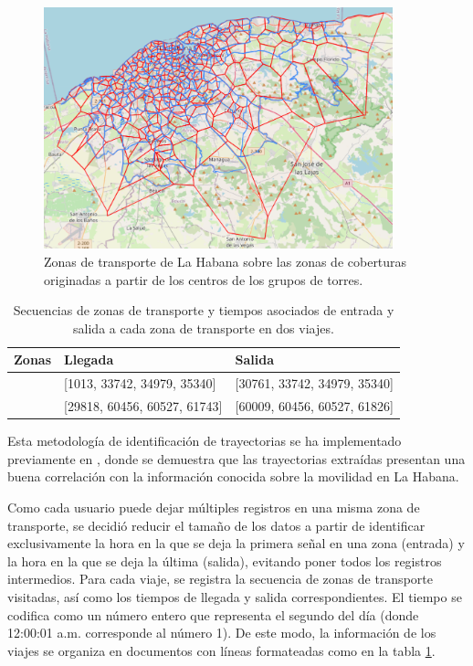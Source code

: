 \begin{figure}[!htb] \centering \includegraphics[width=0.9\textwidth]{Graphics/havana_representation.png} \caption{Zonas de transporte de La Habana sobre las zonas de coberturas originadas a partir de los centros de los grupos de torres.} \label{fig:havana_representation} 
\end{figure}

\begin{table}[h!]
\centering
\begin{tabular}{|p{4cm}|p{5cm}|p{5cm}|}
\hline
\textbf{Zonas}        & \textbf{Llegada}               & \textbf{Salida}                \\ \hline
[87, 106, 108, 113]   & [1013, 33742, 34979, 35340]    & [30761, 33742, 34979, 35340]   \\ \hline
[80, 33, 48, 128]     & [29818, 60456, 60527, 61743]   & [60009, 60456, 60527, 61826]   \\ \hline
\end{tabular}
\caption{Secuencias de zonas de transporte y tiempos asociados de entrada y salida a cada zona de transporte en dos viajes.}
\label{tabla:havana_data_format}
\end{table}

Esta metodología de identificación de trayectorias se ha implementado previamente en \cite{garciaborroto2021}, donde se demuestra que las trayectorias extraídas presentan una buena correlación con la información conocida sobre la movilidad en La Habana.

Como cada usuario puede dejar m\'ultiples registros en una misma zona de transporte, se decidi\'o reducir el tama\~no de los datos a partir de identificar exclusivamente la hora en la que se deja la primera se\~nal en una zona (entrada) y la hora en la que se deja la \'ultima (salida), evitando poner todos los registros intermedios. Para cada viaje, se registra la secuencia de zonas de transporte visitadas, así como los tiempos de llegada y salida correspondientes. El tiempo se codifica como un número entero que representa el segundo del día (donde 12:00:01 a.m. corresponde al número 1). De este modo, la información de los viajes se organiza en documentos con líneas formateadas como en la tabla \ref{tabla:havana_data_format}.

